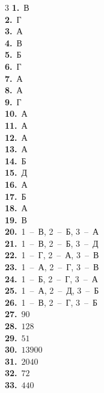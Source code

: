 \documentclass[12pt]{article}
\begin{document}
\begin{multicols}{3}\noindent
\textbf{1.}~В\\
\textbf{2.}~Г\\
\textbf{3.}~А\\
\textbf{4.}~В\\
\textbf{5.}~Б\\
\textbf{6.}~Г\\
\textbf{7.}~А\\
\textbf{8.}~А\\
\textbf{9.}~Г\\
\textbf{10.}~А\\
\textbf{11.}~А\\
\textbf{12.}~А\\
\textbf{13.}~А\\
\textbf{14.}~Б\\
\textbf{15.}~Д\\
\textbf{16.}~А\\
\textbf{17.}~Б\\
\textbf{18.}~А\\
\textbf{19.}~В\\
\textbf{20.}~1~--~В, 2~--~Б, 3~--~А\\
\textbf{21.}~1~--~В, 2~--~Б, 3~--~Д\\
\textbf{22.}~1~--~Г, 2~--~А, 3~--~В\\
\textbf{23.}~1~--~А, 2~--~Г, 3~--~В\\
\textbf{24.}~1~--~Б, 2~--~Г, 3~--~А\\
\textbf{25.}~1~--~А, 2~--~Д, 3~--~Б\\
\textbf{26.}~1~--~В, 2~--~Г, 3~--~Б\\
\textbf{27.}~$90$\\
\textbf{28.}~$128$\\
\textbf{29.}~$51$\\
\textbf{30.}~$13900$\\
\textbf{31.}~$2040$\\
\textbf{32.}~$72$\\
\textbf{33.}~$440$\\
\end{multicols}
\end{document}
